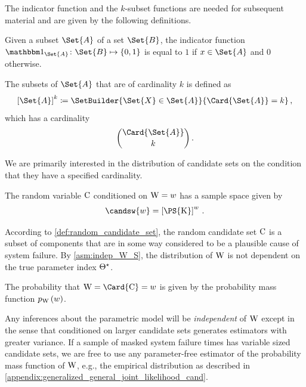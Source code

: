 \documentclass[../main.tex]{subfiles}
\begin{document}
The indicator function and the $k$-subset functions are needed for subsequent material and are given by the following definitions.
\begin{definition}
	Given a subset $\Set{A}$ of a set $\Set{B}$, the indicator function $\SetIndicator{\Set{A}} \colon \Set{B} \mapsto \{0,1\}$
	is equal to $1$ if $x \in \Set{A}$ and $0$ otherwise.
\end{definition}

\begin{definition}
	The subsets of $\Set{A}$ that are of cardinality $k$ is defined as
	\begin{equation}
	\left[\Set{A}\right]^k \coloneqq \SetBuilder{\Set{X} \in \Set{A}}{\Card{\Set{A}} = k}\,,
	\end{equation}
	which has a cardinality
	\begin{equation}
	\binom{\Card{\Set{A}}}{k}\,.
	\end{equation}
\end{definition}

We are primarily interested in the distribution of candidate sets on the condition that they have a specified cardinality.
\begin{definition}
	The random variable $\mathrm{C}$ conditioned on $\mathrm{W} = w$ has a sample space given by
	\begin{equation}
	\candsw{w} = \left[\PS{\RV{K}}\right]^w\,.
	\end{equation}
\end{definition}

According to \cref{def:random_candidate_set}, the random candidate set $\mathrm{C}$ is a subset of components that are in some way considered to be a plausible cause of system failure.
By \cref{asm:indep_W_S}, the distribution of $\mathrm{W}$ is not dependent on the true parameter index ${\Theta}^{\star}$.
\begin{definition}
\label{def:pmf_w}
The probability that $\RV{W} = \Card{\rvcand} = w$ is given by the probability mass function $p_{\mathrm{W}}\left(w\right)$.
\end{definition}
Any inferences about the parametric model will be \emph{independent} of $\mathrm{W}$ except in the sense that conditioned on larger candidate sets generates estimators with greater variance.
If a sample of masked system failure times has variable sized candidate sets, we are free to use any parameter-free estimator of the probability mass function of $\mathrm{W}$, e.g., the empirical distribution as described in \cref{appendix:generalized_general_joint_likelihood_cand}.
\end{document}
